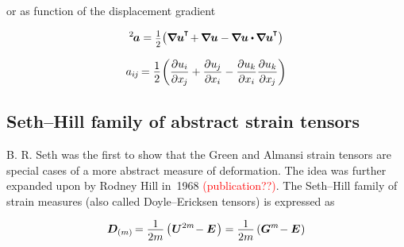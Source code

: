 \vspace{-0.4em}\noindent
or as function of the displacement gradient

\nopagebreak\begin{equation*}
{^2}\hspace{-0.2ex}\bm{a} = \smalldisplaystyleonehalf \bigl(
\boldnabla\bm{u}^{\hspace{-0.1ex}\T} \hspace{-0.3ex}
+ \hspace{-0.1ex} \boldnabla\bm{u}
- \hspace{-0.1ex} \boldnabla\bm{u} \dotp \hspace{-0.1ex} \boldnabla\bm{u}^{\hspace{-0.1ex}\T}
\bigr)
\end{equation*}

\nopagebreak\vspace{-0.2em}\begin{equation*}
\displaystyle a_{i\hspace{-0.1ex}j} \hspace{-0.2ex} = \onehalf \hspace{-0.25ex} \left(
\frac{\partial u_{i}}{\partial x_{\hspace{-0.15ex}j}}
+ \frac{\partial u_{\hspace{-0.1ex}j}}{\partial \hspace{-0.1ex} x_{i}}
- \frac{\partial u_{k}}{\partial x_{i}} \frac{\partial u_{k}}{\partial x_{\hspace{-0.15ex}j}}
\right)
\end{equation*}

\subsection*{Seth\hbox{--}Hill family of abstract strain tensors}

B. R. Seth was the first to show that the Green and Almansi strain tensors are special cases of a more abstract measure of deformation.
The idea was further expanded upon by Rodney Hill in~1968 \textcolor{red}{(publication??)}.
The Seth\hbox{--}Hill family of strain measures (also called Doyle\hbox{--}Ericksen tensors) is expressed as

\nopagebreak\vspace{-0.1em}\begin{equation*}
\displaystyle \bm{D}_{(m)} \hspace{-0.2ex}
= \frac{\raisebox{-0.2em}{1}}{2m} \left( \hspace{.1ex} \bm{U}^{2m} \hspace{-0.4ex} - \UnitDyad \hspace{.2ex} \right)
= \frac{\raisebox{-0.2em}{1}}{2m} \left( \bm{G}^{m} \hspace{-0.4ex} - \UnitDyad \hspace{.1ex} \right) \end{equation*}

